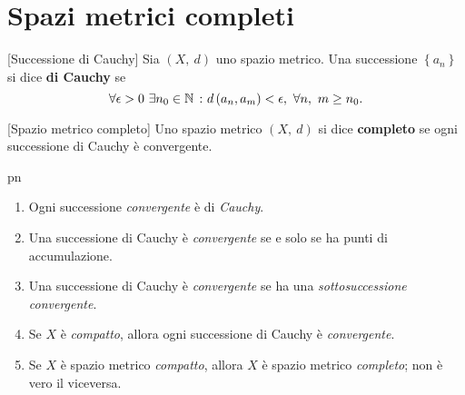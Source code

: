 \section{Spazi metrici completi}
\begin{definition}{}[Successione di Cauchy]
	Sia $\left(X,\ d\right)$ uno spazio metrico. Una successione $\left\{a_n\right\}$ si dice \textbf{di Cauchy} se
	\begin{equation*}
		\forall \epsilon>0\ \exists n_0\in\N\ \colon d\left(a_n,a_m\right)<\epsilon,\ \forall n,\ m\geq n_0.
	\end{equation*}
\end{definition}
\begin{definition}{}[Spazio metrico completo]
	Uno spazio metrico $\left(X,\ d\right)$ si dice \textbf{completo} {\small se ogni successione di Cauchy è convergente.}
\end{definition}
\begin{remark}{pn}~{}
	\begin{enumerate}
		\item Ogni successione \textit{convergente} è di \textit{Cauchy}.
		\item Una successione di Cauchy è \textit{convergente} se e solo se ha punti di accumulazione.
		\item Una successione di Cauchy è \textit{convergente} se ha una \textit{sottosuccessione convergente}.
		\item Se $X$ è \textit{compatto}, allora ogni successione di Cauchy è \textit{convergente}.
		\item Se $X$ è spazio metrico \textit{compatto}, allora $X$ è spazio metrico \textit{completo}; non è vero il viceversa.
	\end{enumerate}
\end{remark}
